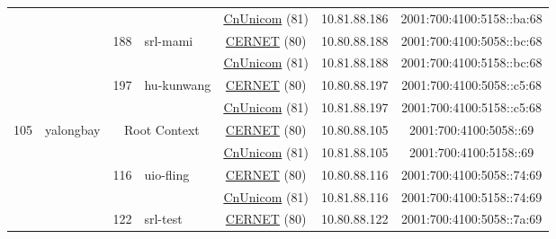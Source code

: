 \begin{small}
\begin{center}
\begin{longtable}{|c|c|c|c|c|c|c|c|}
  &  &  &  & \multicolumn{2}{|c|}{\tiny{\href{http://www.chinaunicom.com}{CnUnicom} (81)}} & \tiny{10.81.88.186} & \tiny{2001:700:4100:5158::ba:68} \\* \cline{3-3}\cline{4-4}\cline{5-5}\cline{6-6}\cline{7-7}\cline{8-8}
  &  & \multirow{2}{*}{\tiny{188}} & \multicolumn{1}{|l|}{\multirow{2}{*}{\tiny{srl-mami}}} & \multicolumn{2}{|c|}{\tiny{\href{http://www.cernet.edu.cn}{CERNET} (80)}} & \tiny{10.80.88.188} & \tiny{2001:700:4100:5058::bc:68} \\* \cline{5-5}\cline{6-6}\cline{7-7}\cline{8-8}
  &  &  &  & \multicolumn{2}{|c|}{\tiny{\href{http://www.chinaunicom.com}{CnUnicom} (81)}} & \tiny{10.81.88.188} & \tiny{2001:700:4100:5158::bc:68} \\* \cline{3-3}\cline{4-4}\cline{5-5}\cline{6-6}\cline{7-7}\cline{8-8}
  &  & \multirow{2}{*}{\tiny{197}} & \multicolumn{1}{|l|}{\multirow{2}{*}{\tiny{hu-kunwang}}} & \multicolumn{2}{|c|}{\tiny{\href{http://www.cernet.edu.cn}{CERNET} (80)}} & \tiny{10.80.88.197} & \tiny{2001:700:4100:5058::c5:68} \\* \cline{5-5}\cline{6-6}\cline{7-7}\cline{8-8}
  &  &  &  & \multicolumn{2}{|c|}{\tiny{\href{http://www.chinaunicom.com}{CnUnicom} (81)}} & \tiny{10.81.88.197} & \tiny{2001:700:4100:5158::c5:68} \\ \hline
 \multirow{26}{*}{\tiny{105}} & \multicolumn{1}{|l|}{\multirow{26}{*}{\tiny{yalongbay}}} & \multicolumn{2}{|c|}{\multirow{2}{*}{\tiny{Root Context}}} & \multicolumn{2}{|c|}{\tiny{\href{http://www.cernet.edu.cn}{CERNET} (80)}} & \tiny{10.80.88.105} & \tiny{2001:700:4100:5058::69} \\* \cline{5-5}\cline{6-6}\cline{7-7}\cline{8-8}
  &  & \multicolumn{2}{|c|}{} & \multicolumn{2}{|c|}{\tiny{\href{http://www.chinaunicom.com}{CnUnicom} (81)}} & \tiny{10.81.88.105} & \tiny{2001:700:4100:5158::69} \\* \cline{3-3}\cline{4-4}\cline{5-5}\cline{6-6}\cline{7-7}\cline{8-8}
  &  & \multirow{2}{*}{\tiny{116}} & \multicolumn{1}{|l|}{\multirow{2}{*}{\tiny{uio-fling}}} & \multicolumn{2}{|c|}{\tiny{\href{http://www.cernet.edu.cn}{CERNET} (80)}} & \tiny{10.80.88.116} & \tiny{2001:700:4100:5058::74:69} \\* \cline{5-5}\cline{6-6}\cline{7-7}\cline{8-8}
  &  &  &  & \multicolumn{2}{|c|}{\tiny{\href{http://www.chinaunicom.com}{CnUnicom} (81)}} & \tiny{10.81.88.116} & \tiny{2001:700:4100:5158::74:69} \\* \cline{3-3}\cline{4-4}\cline{5-5}\cline{6-6}\cline{7-7}\cline{8-8}
  &  & \multirow{2}{*}{\tiny{122}} & \multicolumn{1}{|l|}{\multirow{2}{*}{\tiny{srl-test}}} & \multicolumn{2}{|c|}{\tiny{\href{http://www.cernet.edu.cn}{CERNET} (80)}} & \tiny{10.80.88.122} & \tiny{2001:700:4100:5058::7a:69} \\* \cline{5-5}\cline{6-6}\cline{7-7}\cline{8-8}

\end{longtable}
\end{center}
\end{small}
